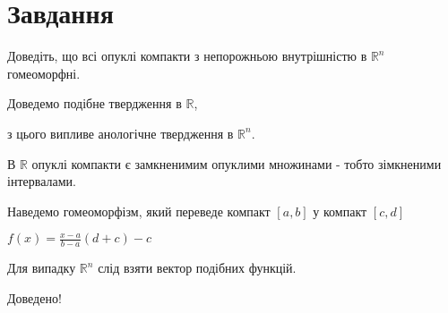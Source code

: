 
\chapter{Завдання \theHchapter}

\begin{tcolorbox}[title=Завдання]
    Доведіть, що всі опуклі компакти з непорожньою
    внутрішністю в $\mathbb{R}^{n}$ гомеоморфні.
\end{tcolorbox}


Доведемо подібне твердження в $\mathbb{R}$, 


з цього випливе анологічне твердження в $\mathbb{R}^n$.


В $\mathbb{R}$ опуклі компакти є замкненимим опуклими множинами - тобто
зімкненими інтервалами. 


Наведемо гомеоморфізм, який переведе компакт $[a, b]$ у компакт $[c, d]$


$f(x) = \frac{x - a}{b - a} (d + c) - c $


Для випадку $\mathbb{R}^n$ слід взяти вектор подібних функцій.


Доведено!